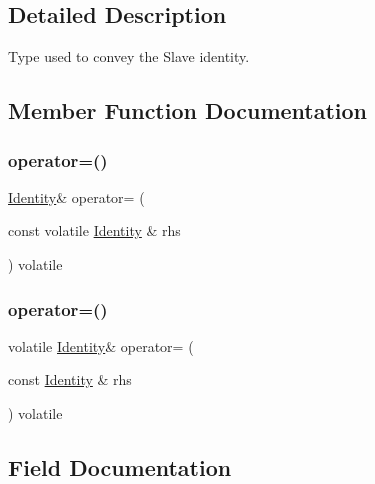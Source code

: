 \subsection{Detailed Description}
Type used to convey the Slave identity. 

\subsection{Member Function Documentation}
\mbox{\label{struct_identity_ae7ccf6e408df14fac9dc856f53d81718}} 
\subsubsection{\texorpdfstring{operator=()}{operator=()}\hspace{0.1cm}{\footnotesize\ttfamily [1/2]}}
{\footnotesize\ttfamily \mbox{\hyperlink{struct_identity}{Identity}}\& operator= (\begin{DoxyParamCaption}\item[{const volatile \mbox{\hyperlink{struct_identity}{Identity}} \&}]{rhs }\end{DoxyParamCaption}) volatile\hspace{0.3cm}{\ttfamily [inline]}}

\mbox{\label{struct_identity_a64f9786e3b6cd410406d14d124be1e7c}} 
\subsubsection{\texorpdfstring{operator=()}{operator=()}\hspace{0.1cm}{\footnotesize\ttfamily [2/2]}}
{\footnotesize\ttfamily volatile \mbox{\hyperlink{struct_identity}{Identity}}\& operator= (\begin{DoxyParamCaption}\item[{const \mbox{\hyperlink{struct_identity}{Identity}} \&}]{rhs }\end{DoxyParamCaption}) volatile\hspace{0.3cm}{\ttfamily [inline]}}



\subsection{Field Documentation}
\mbox{\label{struct_identity_a219419d57e4c4e0d53ddcb44af330f32}} 
